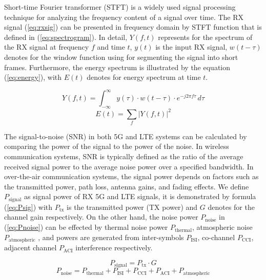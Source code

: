 \documentclass[journal]{IEEEtran} %
\begin{document}
\indent Short-time Fourier transformer (STFT) is a widely used signal processing technique for analyzing the frequency content of a signal over time. The RX signal (\ref{eq:rxsig}) can be presented in frequency domain by STFT function that is defined in (\ref{eq:spectrogram}). In detail, \( Y(f, t)\) represents for the spectrum of the RX signal at frequency \(f\) and time \(t\), \(y(t)\) is the input RX signal, \(w(t - \tau)\) denotes for the window function using for segmenting the signal into short frames. Furthermore, the energy spectrum is illustrated by the equation (\ref{eq:energy}), with \(E(t)\) denotes for energy spectrum at time \(t\).

\begin{equation}
    Y(f, t) = \int_{-\infty}^{\infty} y(\tau) \cdot w(t - \tau) \cdot e^{-j2\pi f \tau} \, d\tau 
    \label{eq:spectrogram}
\end{equation}
\begin{equation}
    E(t) = \sum_{f} \left| Y(f, t) \right|^2 
    \label{eq:energy}
\end{equation}


\indent The signal-to-noise (SNR) in both 5G and LTE systems can be calculated by comparing the power of the signal to the power of the noise. In wireless communication systems, SNR is typically defined as the ratio of the average received signal power to the average noise power over a specified bandwidth. In over-the-air communication systems, the signal power depends on factors such as the transmitted power, path loss, antenna gains, and fading effects. We define \(P_{\text{signal}}\) as signal power of RX 5G and LTE signals, it is demonstrated by formula (\ref{eq:Psig}) with \(P_{\text{tx}}\) is the transmitted power (TX power) and \(G\) denotes for the channel gain respectively. On the other hand, the noise power \(P_{\text{noise}}\) in (\ref{eq:Pnoise}) can be effected by thermal noise power \(P_{\text{thermal}}\), atmospheric noise \(P_{\text{atmospheric}}\) , and powers are generated from inter-symbols \(P_{\text{ISI}}\), co-channel \(P_{\text{CCI}}\), adjacent channel \(P_{\text{ACI}}\) interference respectively. 

\begin{equation}
    P_{\text{signal}} = P_{\text{tx}} \cdot G   
    \label{eq:Psig}
\end{equation}
\begin{equation}
    P_{\text{noise}} = P_{\text{thermal}} + P_{\text{ISI}} + P_{\text{CCI}} + P_{\text{ACI}} + P_{\text{atmospheric}}   
    \label{eq:Pnoise}
\end{equation}
\end{document}
